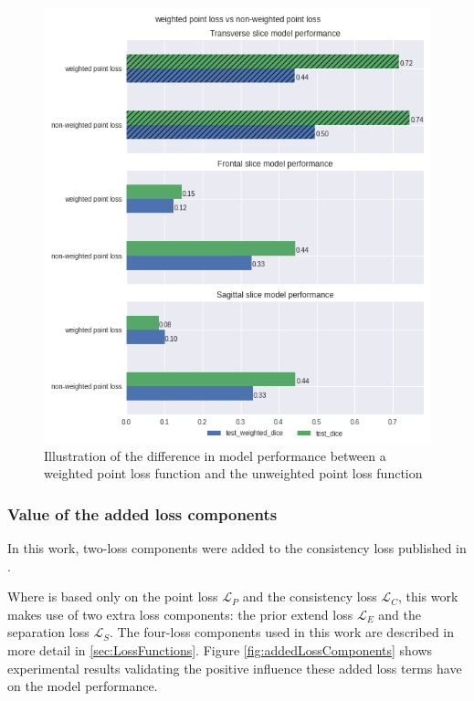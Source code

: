 \begin{figure}
    \centering
    \includegraphics[width=.95\textwidth]{images/weightedvsnonweighted.png}
    \caption{Illustration of the difference in model performance between a weighted point loss function and the unweighted point loss function\label{fig:weighted_vs_unweighted}}
\end{figure}

\subsubsection{Value of the added loss components}
\par{
    In this work, two-loss components were added to the consistency loss published in \cite{Laradji}.
    
    Where \cite{Laradji} is based only on the point loss $\mathcal{L}_P$ and the consistency loss $\mathcal{L}_C$, this work makes use of two extra loss components:
    the prior extend loss $\mathcal{L}_E$ and the separation loss $\mathcal{L}_S$. The four-loss components used in this work are described in more detail in \ref{sec:LossFunctions}.
    Figure \ref{fig:addedLossComponents} shows experimental results validating the positive influence these added loss terms have on the model performance.
}


